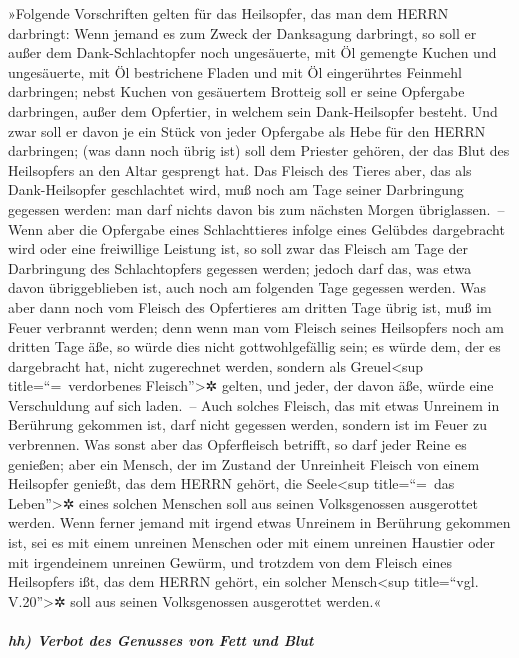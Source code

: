 »Folgende Vorschriften gelten für das Heilsopfer, das man
dem HERRN darbringt: Wenn jemand es zum Zweck der
Danksagung darbringt, so soll er außer dem Dank-Schlachtopfer noch
ungesäuerte, mit Öl gemengte Kuchen und ungesäuerte, mit Öl bestrichene
Fladen und mit Öl eingerührtes Feinmehl darbringen; nebst
Kuchen von gesäuertem Brotteig soll er seine Opfergabe darbringen, außer
dem Opfertier, in welchem sein Dank-Heilsopfer besteht.
Und zwar soll er davon je ein Stück von jeder Opfergabe
als Hebe für den HERRN darbringen; (was dann noch übrig ist) soll dem
Priester gehören, der das Blut des Heilsopfers an den Altar gesprengt
hat. Das Fleisch des Tieres aber, das als Dank-Heilsopfer
geschlachtet wird, muß noch am Tage seiner Darbringung gegessen werden:
man darf nichts davon bis zum nächsten Morgen übriglassen.~--
Wenn aber die Opfergabe eines Schlachttieres infolge
eines Gelübdes dargebracht wird oder eine freiwillige Leistung ist, so
soll zwar das Fleisch am Tage der Darbringung des Schlachtopfers
gegessen werden; jedoch darf das, was etwa davon übriggeblieben ist,
auch noch am folgenden Tage gegessen werden. Was aber
dann noch vom Fleisch des Opfertieres am dritten Tage übrig ist, muß im
Feuer verbrannt werden; denn wenn man vom Fleisch seines
Heilsopfers noch am dritten Tage äße, so würde dies nicht
gottwohlgefällig sein; es würde dem, der es dargebracht hat, nicht
zugerechnet werden, sondern als Greuel\textless sup
title=``=~verdorbenes Fleisch''\textgreater✲ gelten, und jeder, der
davon äße, würde eine Verschuldung auf sich laden.~--
Auch solches Fleisch, das mit etwas Unreinem in Berührung
gekommen ist, darf nicht gegessen werden, sondern ist im Feuer zu
verbrennen. Was sonst aber das Opferfleisch betrifft, so darf jeder
Reine es genießen; aber ein Mensch, der im Zustand der
Unreinheit Fleisch von einem Heilsopfer genießt, das dem HERRN gehört,
die Seele\textless sup title=``=~das Leben''\textgreater✲ eines solchen
Menschen soll aus seinen Volksgenossen ausgerottet werden.
Wenn ferner jemand mit irgend etwas Unreinem in Berührung
gekommen ist, sei es mit einem unreinen Menschen oder mit einem unreinen
Haustier oder mit irgendeinem unreinen Gewürm, und trotzdem von dem
Fleisch eines Heilsopfers ißt, das dem HERRN gehört, ein solcher
Mensch\textless sup title=``vgl. V.20''\textgreater✲ soll aus seinen
Volksgenossen ausgerottet werden.«

\hypertarget{hh-verbot-des-genusses-von-fett-und-blut}{%
\subparagraph{hh) Verbot des Genusses von Fett und
Blut}\label{hh-verbot-des-genusses-von-fett-und-blut}}

